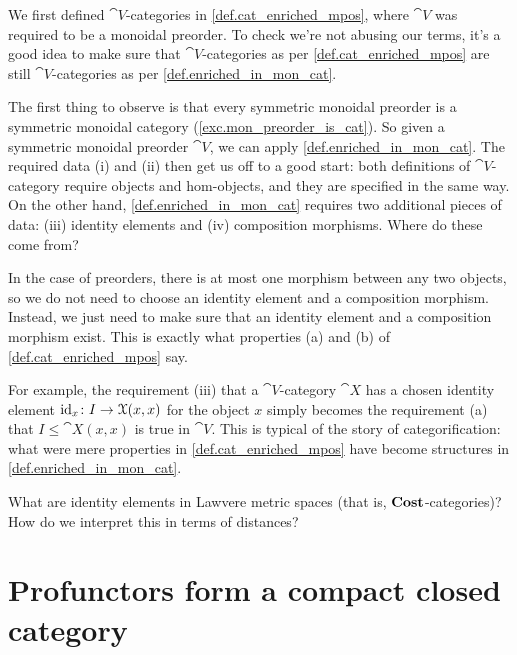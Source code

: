 \documentclass[7Sketches]{subfiles}
\begin{document}
\begin{remark} %
\label{rem.cats_and_vcats2}%
We first defined $\cat{V}$-categories in \cref{def.cat_enriched_mpos}, where
$\cat{V}$ was required to be a monoidal preorder. To check we're not abusing our
terms, it's a good idea to make sure that $\cat{V}$-categories as per
\cref{def.cat_enriched_mpos} are still $\cat{V}$-categories as per
\cref{def.enriched_in_mon_cat}. 

The first thing to observe is that every symmetric monoidal preorder is a symmetric
monoidal category (\cref{exc.mon_preorder_is_cat}). So given a symmetric monoidal
preorder $\cat{V}$, we can apply \cref{def.enriched_in_mon_cat}.
The required data (i) and (ii) then get us off to a good start: both definitions of
$\cat{V}$-category require objects and hom-objects, and they are specified in
the same way. On the other hand, \cref{def.enriched_in_mon_cat} requires two
additional pieces of data: (iii) identity elements and (iv) composition
morphisms. Where do these come from?%

In the case of preorders, there is at most one morphism between any two objects, so
we do not need to choose an identity element and a composition morphism.
Instead, we just need to make sure that an identity element and a composition
morphism exist. This is exactly what properties (a) and (b) of
\cref{def.cat_enriched_mpos} say. 

For example, the requirement (iii) that a $\cat{V}$-category $\cat{X}$ has a
chosen identity element $\mathrm{id}_x\colon I \to \mathcal{X}(x,x)$ for the object $x$
simply becomes the requirement (a) that $I \le \cat{X}(x,x)$ is true in
$\cat{V}$. This is typical of the story of categorification: what were mere
properties in \cref{def.cat_enriched_mpos} have become structures in
\cref{def.enriched_in_mon_cat}.
\end{remark}

\begin{exercise} %
\label{exc.metric_space_identities}
What are identity elements in Lawvere metric spaces (that is,
$\mathbf{Cost}$-categories)? How do we interpret this in terms of distances?
\end{exercise}

\section{Profunctors form a compact closed category}%
%
\end{document}
